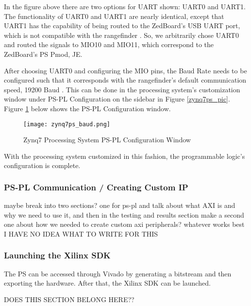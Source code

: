 In the figure above there are two options for UART shown: UART0 and UART1. The functionality of UART0 and UART1 are nearly identical, except that UART1 has the capability of being routed to the ZedBoard's USB UART port, which is not compatible with the rangefinder \cite{zedboard_datasheet}. So, we arbitrarily chose UART0 and routed the signals to MIO10 and MIO11, which correspond to the ZedBoard's PS Pmod, JE.
\par
After choosing UART0 and configuring the MIO pins, the Baud Rate needs to be configured such that it corresponds with the rangefinder's default communication speed, 19200 Baud \cite{urg04lx_datasheet}. This can be done in the processing system's customization window under PS-PL Configuration on the sidebar in Figure \ref{zynq7ps_pic}. Figure \ref{zynq7ps_baud_pic} below shows the PS-PL Configuration window.

\begin{figure}[H]
	\centerline{\texttt{[image: zynq7ps\_baud.png]}}
	\caption{Zynq7 Processing System PS-PL Configuration Window}
	\label{zynq7ps_baud_pic}
\end{figure}

With the processing system customized in this fashion, the programmable logic's configuration is complete.

\subsubsection{PS-PL Communication / Creating Custom IP}
\label{sssec:ps_pl}
maybe break into two sections? one for ps-pl and talk about what AXI is and why we need to use it, and then in the testing and results section make a second one about how we needed to create custom axi peripherals? whatever works best
I HAVE NO IDEA WHAT TO WRITE FOR THIS

\subsubsection{Launching the Xilinx SDK}
The PS can be accessed through Vivado by generating a bitstream and then exporting the hardware. After that, the Xilinx SDK can be launched.

\par
DOES THIS SECTION BELONG HERE??




